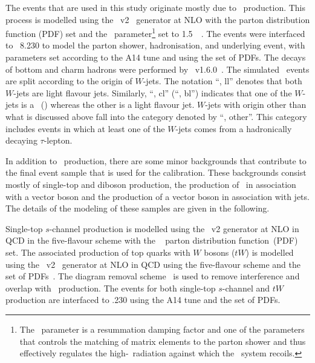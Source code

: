 \documentclass[letterpaper,12pt]{article}
\begin{document}
The events that are used in this study originate mostly due to 
\ttbar\ production. This process is modelled using the
\powhegbox~v2~\cite{Frixione:2007nw,Nason:2004rx,Frixione:2007vw,Alioli:2010xd}
generator at NLO with the \nnpdfnlo %
parton distribution function (PDF) set
and the \hdamp\ parameter\footnote{The
  \hdamp\ parameter is a resummation damping factor and one of the
  parameters that controls the matching of \powheg matrix elements to
  the parton shower and thus effectively regulates the
  high-\pt\ radiation against which the \ttbar\ system recoils.} set
to 1.5~\mtop~\cite{ATL-PHYS-PUB-2016-020}.  The events were interfaced
to {\PYTHIA}~8.230 to model the parton shower,
hadronisation, and underlying event, with parameters set according
to the A14 tune and using the \nnpdftwo set of PDFs.
The decays of bottom and charm hadrons were performed by \evtgen~v1.6.0~\cite{EvtGen}.
 The simulated \ttbar\
events are split according to the origin of $W$-jets. The notation
``\ttbar, ll'' denotes that both $W$-jets are light flavour jets.
Similarly, ``\ttbar, cl'' (``\ttbar, bl'') 
indicates that one of the $W$-jets is a \cjet\ (\bjet)
whereas the other is a light flavour jet. $W$-jets with origin
other than what is discussed above fall into the 
category denoted by ``\ttbar, other''. This category includes
events in which at least one of the $W$-jets comes from a
hadronically decaying $\tau$-lepton. 

In addition to \ttbar\ production, there are some minor backgrounds
that contribute to the final event sample that is used for the calibration.
These backgrounds consist mostly of single-top and diboson production, 
the production of \ttbar\ in association with a vector boson
and the production of a vector boson in association with jets.
The details
of the modeling of these samples are given in the following.

Single-top $s$-channel production is modelled using the \powhegbox~v2 %
generator at NLO in QCD in the five-flavour scheme with the \nnpdfnlo~\cite{Ball:2014uwa} parton distribution function~(PDF) set.
%
The associated production of top quarks with $W$ bosons ($tW$) is
modelled using the
\powhegbox~v2~\cite{Re:2010bp,Nason:2004rx,Frixione:2007vw,Alioli:2010xd}
generator at NLO in QCD using the five-flavour scheme and the
\nnpdfnlo set of PDFs~\cite{Ball:2014uwa}.
The diagram removal scheme~\cite{Frixione:2008yi} is used to
remove interference and overlap with \ttbar\ production. 
The events for both single-top $s$-channel and $tW$ production 
are interfaced to \pythia.230%
using the A14 tune%
and the \nnpdftwo set of PDFs. %
\end{document}
